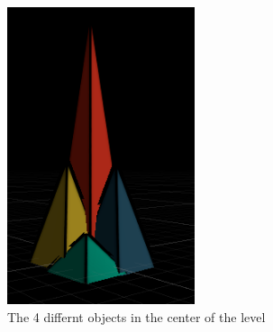 \begin{figure}[p]
  \includegraphics[width=0.49\textwidth, height=1\textwidth]{images/workflow/object_morphing/Obj_4.png}
  \caption{The 4 differnt objects in the center of the level}
  \label{MorphingObjs}
\end{figure}

